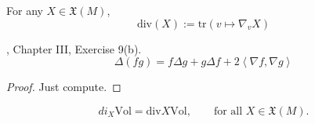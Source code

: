 \begin{definition}
\label{definition-divergence}
For any $X\in \mathfrak{X}(M)$,
$$
\text{div}(X):=\text{tr}(v\mapsto \nabla_vX)
$$
\end{definition}

\begin{lemma}
\label{lemma-Laplacian-of-product}
\cite{doc}, Chapter III, Exercise 9(b).
\begin{equation}
\label{equation-Laplacian-of-product}
\Delta(fg)=f \Delta g + g \Delta f+2\left<\nabla f,\nabla g\right>
\end{equation}
\end{lemma}

\begin{proof}
Just compute.
\end{proof}

\begin{lemma}
\label{lemma-divergence-and-volume}
\begin{equation}
\label{equation-divergence-and-volume}
di_X\text{Vol}=\text{div}X\text{Vol},\qquad \text{for all }X\in \mathfrak{X}(M).
\end{equation}
\end{lemma}

